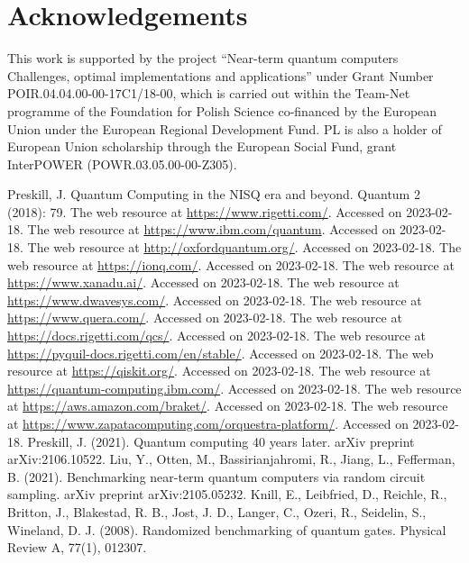 \documentclass[preprint,12pt, a4paper, dvipsnames]{elsarticle}
\newcommand{\1}{{\rm 1\hspace{-0.9mm}l}}
\theoremstyle{definition}
\begin{document}
\section*{Acknowledgements}

This work is  supported by
the project “Near-term quantum computers Challenges, optimal implementations and applications” under Grant Number POIR.04.04.00-00-17C1/18-00, which is carried out within the Team-Net programme of the Foundation for Polish Science co-financed by the European Union under the European Regional Development Fund.
PL is also a holder of European Union scholarship through the European Social Fund,
grant InterPOWER (POWR.03.05.00-00-Z305).


\begin{thebibliography}{00}
 Preskill, J. Quantum Computing in the NISQ era and beyond. Quantum 2 (2018): 79.
 The web resource at \url{https://www.rigetti.com/}. Accessed on 2023-02-18.
 The web resource at \url{https://www.ibm.com/quantum}. Accessed on 2023-02-18.
 The web resource at \url{http://oxfordquantum.org/}. Accessed on 2023-02-18.
 The web resource at \url{https://ionq.com/}. Accessed on 2023-02-18.
 The web resource at \url{https://www.xanadu.ai/}. Accessed on 2023-02-18.
 The web resource at \url{https://www.dwavesys.com/}. Accessed on 2023-02-18.
 The web resource at \url{https://www.quera.com/}. Accessed on 2023-02-18.
 The web resource at \url{https://docs.rigetti.com/qcs/}. Accessed on 2023-02-18.
 The web resource at \url{https://pyquil-docs.rigetti.com/en/stable/}. Accessed on 2023-02-18.
 The web resource at \url{https://qiskit.org/}. Accessed on 2023-02-18.
 The web resource at \url{https://quantum-computing.ibm.com/}. Accessed on 2023-02-18.
 The web resource at \url{https://aws.amazon.com/braket/}. Accessed on 2023-02-18.
 The web resource at \url{https://www.zapatacomputing.com/orquestra-platform/}. Accessed on 2023-02-18.
 Preskill, J. (2021). Quantum computing 40 years later. arXiv preprint arXiv:2106.10522.
 	Liu, Y., Otten, M., Bassirianjahromi, R., Jiang, L.,  Fefferman, B. (2021). Benchmarking near-term quantum computers via random circuit sampling. arXiv preprint arXiv:2105.05232.
Knill, E., Leibfried, D., Reichle, R., Britton, J., Blakestad, R. B., Jost, J. D., Langer, C., Ozeri, R., Seidelin, S.,  Wineland, D. J. (2008). Randomized benchmarking of quantum gates. Physical Review A, 77(1), 012307.

\end{thebibliography}
\end{document}
